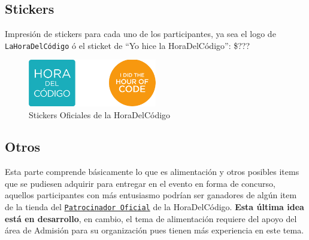 \documentclass[letterpaper,12pt]{article}
\begin{document}
\subsection{Stickers}

Impresión de stickers para cada uno de los participantes, ya sea el logo de \texttt{LaHoraDelCódigo} ó el sticket de ``Yo hice la HoraDelCódigo'': \$???

\begin{figure}[H]
  \centering
    \includegraphics[width=0.5\textwidth]{sticker}
  \caption{Stickers Oficiales de la HoraDelCódigo}
\end{figure}

\subsection{Otros}

Esta parte comprende básicamente lo que es alimentación y otros posibles items que se pudiesen adquirir para entregar en el evento en forma de concurso, aquellos participantes con más entusiasmo podrían ser ganadores de algún item de la tienda del \texttt{\href{https://store.code.org/collections/featured-items/products/code-org-8-bit-sunglasses}{Patrocinador Oficial}} de la HoraDelCódigo. \textbf{Esta última idea está en desarrollo}, en cambio, el tema de alimentación requiere del apoyo del área de Admisión para su organización pues tienen más experiencia en este tema.
\end{document}
